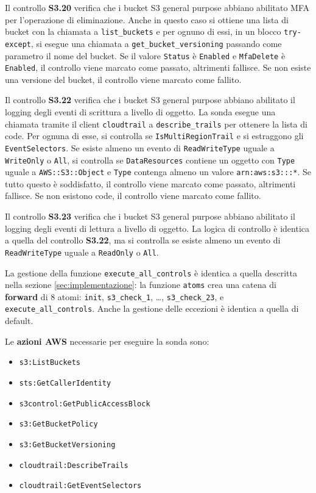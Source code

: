 Il controllo \textbf{S3.20} verifica che i bucket S3 general purpose abbiano abilitato MFA per l'operazione di eliminazione. Anche in questo caso si ottiene una lista di bucket con la chiamata a \texttt{list\_buckets} e per ognuno di essi, in un blocco \texttt{try-except}, si esegue una chiamata a \texttt{get\_bucket\_versioning} passando come parametro il nome del bucket. Se il valore \texttt{Status} è \texttt{Enabled} e \texttt{MfaDelete} è \texttt{Enabled}, il controllo viene marcato come passato, altrimenti fallisce. Se non esiste una versione del bucket, il controllo viene marcato come fallito.

Il controllo \textbf{S3.22} verifica che i bucket S3 general purpose abbiano abilitato il logging degli eventi di scrittura a livello di oggetto. La sonda esegue una chiamata tramite il client \texttt{cloudtrail} a \texttt{describe\_trails} per ottenere la lista di code. Per ognuna di esse, si controlla se \texttt{IsMultiRegionTrail} e si estraggono gli \texttt{EventSelectors}. Se esiste almeno un evento di \texttt{ReadWriteType} uguale a \texttt{WriteOnly} o \texttt{All}, si controlla se \texttt{DataResources} contiene un oggetto con \texttt{Type} uguale a \texttt{AWS::S3::Object} e \texttt{Type} contenga almeno un  valore \texttt{arn:aws:s3:::*}. Se tutto questo è soddisfatto, il controllo viene marcato come passato, altrimenti fallisce. Se non esistono code, il controllo viene marcato come fallito.

Il controllo \textbf{S3.23} verifica che i bucket S3 general purpose abbiano abilitato il logging degli eventi di lettura a livello di oggetto. La logica di controllo è identica a quella del controllo \textbf{S3.22}, ma si controlla se esiste almeno un evento di \texttt{ReadWriteType} uguale a \texttt{ReadOnly} o \texttt{All}. 

La gestione della funzione \texttt{execute\_all\_controls} è identica a quella descritta nella sezione \ref{sec:implementazione}: la funzione \texttt{atoms} crea una catena di \textbf{forward} di 8 atomi: \texttt{init}, \texttt{s3\_check\_1}, \dots, \texttt{s3\_check\_23}, e \texttt{execute\_all\_controls}. Anche la gestione delle eccezioni è identica a quella di default.

Le \textbf{azioni AWS} necessarie per eseguire la sonda sono:
\begin{itemize}
    \item \texttt{s3:ListBuckets}
    \item \texttt{sts:GetCallerIdentity}
    \item \texttt{s3control:GetPublicAccessBlock}
    \item \texttt{s3:GetBucketPolicy}
    \item \texttt{s3:GetBucketVersioning}
    \item \texttt{cloudtrail:DescribeTrails}
    \item \texttt{cloudtrail:GetEventSelectors}
\end{itemize}

